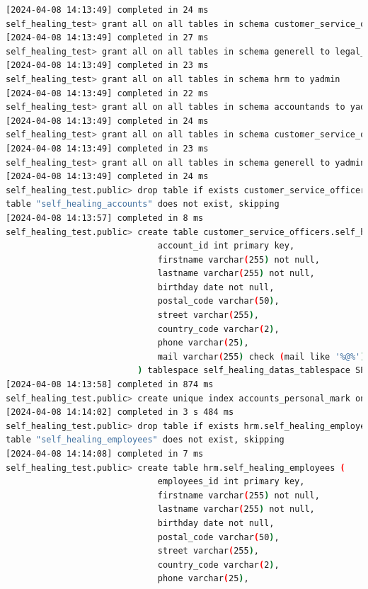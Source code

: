 \begin{flushleft}
\begin{lstlisting}[language=bash, caption=yugabyteDB - Evaluation-Testing,captionpos=b,label={lst:yugabytedb-evaluation-testing},breaklines=true]
[2024-04-08 14:13:49] completed in 24 ms
self_healing_test> grant all on all tables in schema customer_service_officers to legal_affairs
[2024-04-08 14:13:49] completed in 27 ms
self_healing_test> grant all on all tables in schema generell to legal_affairs
[2024-04-08 14:13:49] completed in 23 ms
self_healing_test> grant all on all tables in schema hrm to yadmin
[2024-04-08 14:13:49] completed in 22 ms
self_healing_test> grant all on all tables in schema accountands to yadmin
[2024-04-08 14:13:49] completed in 24 ms
self_healing_test> grant all on all tables in schema customer_service_officers to yadmin
[2024-04-08 14:13:49] completed in 23 ms
self_healing_test> grant all on all tables in schema generell to yadmin
[2024-04-08 14:13:49] completed in 24 ms
self_healing_test.public> drop table if exists customer_service_officers.self_healing_accounts
table "self_healing_accounts" does not exist, skipping
[2024-04-08 14:13:57] completed in 8 ms
self_healing_test.public> create table customer_service_officers.self_healing_accounts (
                              account_id int primary key,
                              firstname varchar(255) not null,
                              lastname varchar(255) not null,
                              birthday date not null,
                              postal_code varchar(50),
                              street varchar(255),
                              country_code varchar(2),
                              phone varchar(25),
                              mail varchar(255) check (mail like '%@%')
                          ) tablespace self_healing_datas_tablespace SPLIT INTO 3 TABLETS
[2024-04-08 14:13:58] completed in 874 ms
self_healing_test.public> create unique index accounts_personal_mark on customer_service_officers.self_healing_accounts(firstname, lastname, birthday) tablespace self_healing_indices_tablespace
[2024-04-08 14:14:02] completed in 3 s 484 ms
self_healing_test.public> drop table if exists hrm.self_healing_employees
table "self_healing_employees" does not exist, skipping
[2024-04-08 14:14:08] completed in 7 ms
self_healing_test.public> create table hrm.self_healing_employees (
                              employees_id int primary key,
                              firstname varchar(255) not null,
                              lastname varchar(255) not null,
                              birthday date not null,
                              postal_code varchar(50),
                              street varchar(255),
                              country_code varchar(2),
                              phone varchar(25),

\end{lstlisting}
\end{flushleft}
